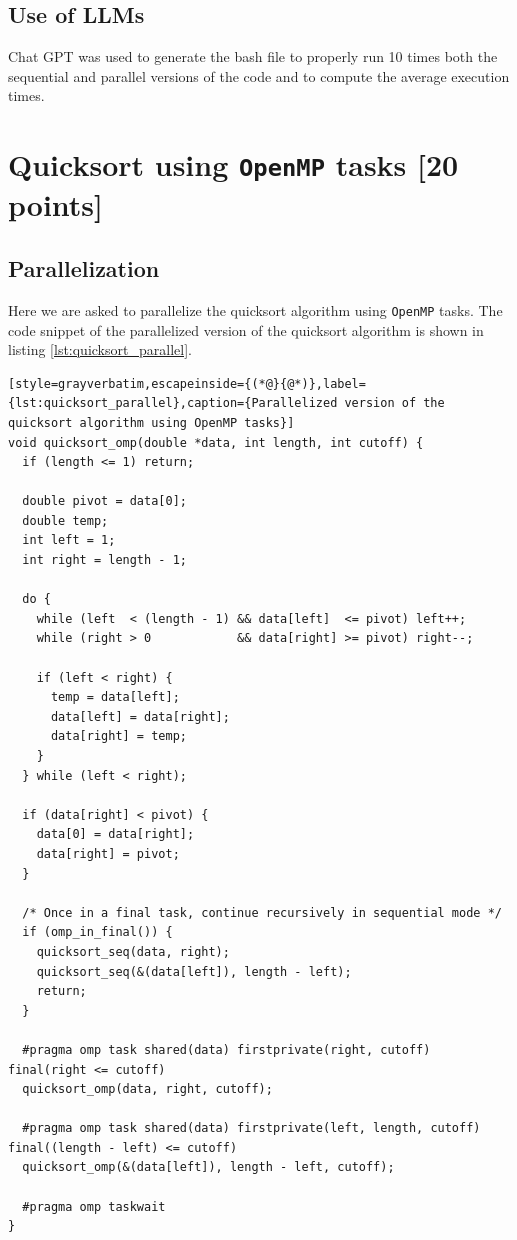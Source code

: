 \documentclass[unicode,10pt,a4paper,oneside,numbers=endperiod,openany]{scrartcl}
\begin{document}
\subsection{Use of LLMs}
Chat GPT was used to generate the bash file to properly run 10 times both the sequential and parallel versions of the code and to compute the average execution times.
\newpage
\section{Quicksort using \texttt{OpenMP} tasks [20 points]}
\subsection{Parallelization}
Here we are asked to parallelize the quicksort algorithm using \texttt{OpenMP} tasks. The code snippet of the parallelized version of the quicksort algorithm is shown in listing \ref{lst:quicksort_parallel}.
\begin{lstlisting}[style=grayverbatim,escapeinside={(*@}{@*)},label={lst:quicksort_parallel},caption={Parallelized version of the quicksort algorithm using OpenMP tasks}]
void quicksort_omp(double *data, int length, int cutoff) {
  if (length <= 1) return;

  double pivot = data[0];
  double temp;
  int left = 1;
  int right = length - 1;

  do {
    while (left  < (length - 1) && data[left]  <= pivot) left++;
    while (right > 0            && data[right] >= pivot) right--;

    if (left < right) {
      temp = data[left];
      data[left] = data[right];
      data[right] = temp;
    }
  } while (left < right);

  if (data[right] < pivot) {
    data[0] = data[right];
    data[right] = pivot;
  }

  /* Once in a final task, continue recursively in sequential mode */
  if (omp_in_final()) {
    quicksort_seq(data, right);
    quicksort_seq(&(data[left]), length - left);
    return;
  }

  #pragma omp task shared(data) firstprivate(right, cutoff) final(right <= cutoff)
  quicksort_omp(data, right, cutoff);

  #pragma omp task shared(data) firstprivate(left, length, cutoff) final((length - left) <= cutoff)
  quicksort_omp(&(data[left]), length - left, cutoff);

  #pragma omp taskwait
}
\end{lstlisting}
\end{document}
